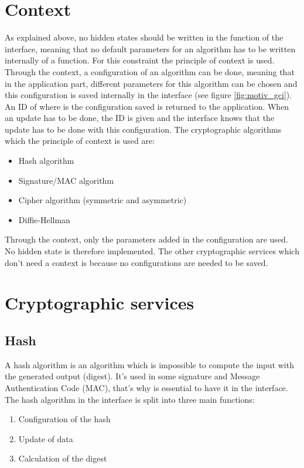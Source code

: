 \section{Context}
\label{gci_ctx}
As explained above, no hidden states should be written in the function of the
interface, meaning that no default parameters for an algorithm has to be written
internally of a function.
For this constraint the principle of context is used.
Through the context, a configuration of an algorithm can be done, meaning that
in the application part, different parameters for this
algorithm can be chosen and this configuration is saved internally in the
interface (see figure \ref{fig:motiv_gci}).
An ID of where is the configuration saved is returned to the application.\newline
When an update has to be done, the ID is given and the interface knows that the
update has to be done with this configuration.
The cryptographic algorithms which the principle of context is used are:
\begin{itemize}[noitemsep]
  \item Hash algorithm
  \item Signature/MAC algorithm
  \item Cipher algorithm (symmetric and asymmetric)
  \item Diffie-Hellman\newline
\end{itemize}
Through the context, only the parameters added in the configuration are used. No
hidden state is therefore implemented.
The other cryptographic services which don't need a context is because no
configurations are needed to be saved.

\section{Cryptographic services}
\subsection{Hash}
\label{gci_hash}

A hash algorithm is an algorithm which is impossible to compute the input with
the generated output (digest).
It's used in some signature and Message Authentication Code (MAC), that's why is
essential to have it in the interface.
The hash algorithm in the interface is split into three main functions:
\begin{enumerate}[noitemsep]
  \item Configuration of the hash
  \item Update of data
  \item Calculation of the digest
  
\end{enumerate}


